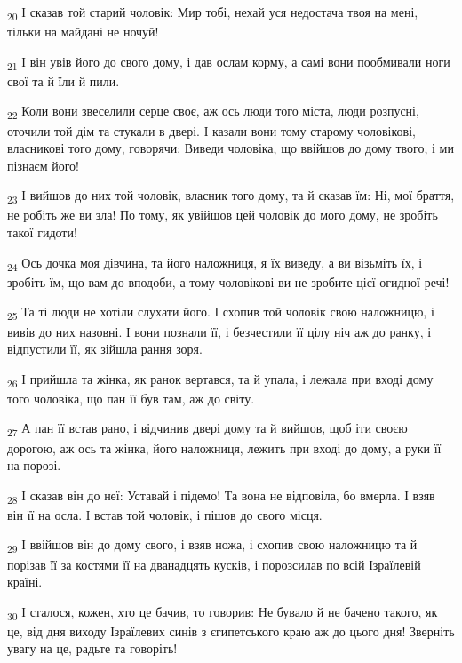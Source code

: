 \begin{tcolorbox}
\textsubscript{20} І сказав той старий чоловік: Мир тобі, нехай уся недостача твоя на мені, тільки на майдані не ночуй!
\end{tcolorbox}
\begin{tcolorbox}
\textsubscript{21} І він увів його до свого дому, і дав ослам корму, а самі вони пообмивали ноги свої та й їли й пили.
\end{tcolorbox}
\begin{tcolorbox}
\textsubscript{22} Коли вони звеселили серце своє, аж ось люди того міста, люди розпусні, оточили той дім та стукали в двері. І казали вони тому старому чоловікові, власникові того дому, говорячи: Виведи чоловіка, що ввійшов до дому твого, і ми пізнаєм його!
\end{tcolorbox}
\begin{tcolorbox}
\textsubscript{23} І вийшов до них той чоловік, власник того дому, та й сказав їм: Ні, мої браття, не робіть же ви зла! По тому, як увійшов цей чоловік до мого дому, не зробіть такої гидоти!
\end{tcolorbox}
\begin{tcolorbox}
\textsubscript{24} Ось дочка моя дівчина, та його наложниця, я їх виведу, а ви візьміть їх, і зробіть їм, що вам до вподоби, а тому чоловікові ви не зробите цієї огидної речі!
\end{tcolorbox}
\begin{tcolorbox}
\textsubscript{25} Та ті люди не хотіли слухати його. І схопив той чоловік свою наложницю, і вивів до них назовні. І вони познали її, і безчестили її цілу ніч аж до ранку, і відпустили її, як зійшла рання зоря.
\end{tcolorbox}
\begin{tcolorbox}
\textsubscript{26} І прийшла та жінка, як ранок вертався, та й упала, і лежала при вході дому того чоловіка, що пан її був там, аж до світу.
\end{tcolorbox}
\begin{tcolorbox}
\textsubscript{27} А пан її встав рано, і відчинив двері дому та й вийшов, щоб іти своєю дорогою, аж ось та жінка, його наложниця, лежить при вході до дому, а руки її на порозі.
\end{tcolorbox}
\begin{tcolorbox}
\textsubscript{28} І сказав він до неї: Уставай і підемо! Та вона не відповіла, бо вмерла. І взяв він її на осла. І встав той чоловік, і пішов до свого місця.
\end{tcolorbox}
\begin{tcolorbox}
\textsubscript{29} І ввійшов він до дому свого, і взяв ножа, і схопив свою наложницю та й порізав її за костями її на дванадцять кусків, і порозсилав по всій Ізраїлевій країні.
\end{tcolorbox}
\begin{tcolorbox}
\textsubscript{30} І сталося, кожен, хто це бачив, то говорив: Не бувало й не бачено такого, як це, від дня виходу Ізраїлевих синів з єгипетського краю аж до цього дня! Зверніть увагу на це, радьте та говоріть!
\end{tcolorbox}
